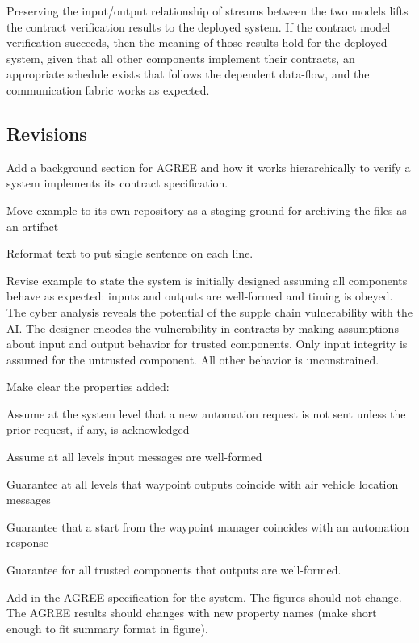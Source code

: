 Preserving the input/output relationship of streams between the two models lifts the contract verification results to the deployed system.
If the contract model verification succeeds, then the meaning of those results hold for the deployed system, given that all other components implement their contracts, an appropriate schedule exists that follows the dependent data-flow, and the communication fabric works as expected.

\subsection{Revisions}
Add a background section for AGREE and how it works hierarchically to verify a system implements its contract specification.

Move example to its own repository as a staging ground for archiving the files as an artifact

Reformat text to put single sentence on each line.

Revise example to state the system is initially designed assuming all components behave as expected: inputs and outputs are well-formed and timing is obeyed.
The cyber analysis reveals the potential of the supple chain vulnerability with the AI.
The designer encodes the vulnerability in contracts by making assumptions about input and output behavior for trusted components.
Only input integrity is assumed for the untrusted component.
All other behavior is unconstrained.

Make clear the properties added:
\begin{compactitem}
  \item Assume at the system level that a new automation request is not sent unless the prior request, if any, is acknowledged
  \item Assume at all levels input messages are well-formed
  \item Guarantee at all levels that waypoint outputs coincide with air vehicle location messages
  \item Guarantee that a start from the waypoint manager coincides with an automation response
  \item Guarantee for all trusted components that outputs are well-formed.
\end{compactitem}

Add in the AGREE specification for the system.
The figures should not change.
The AGREE results should changes with new property names (make short enough to fit summary format in figure).